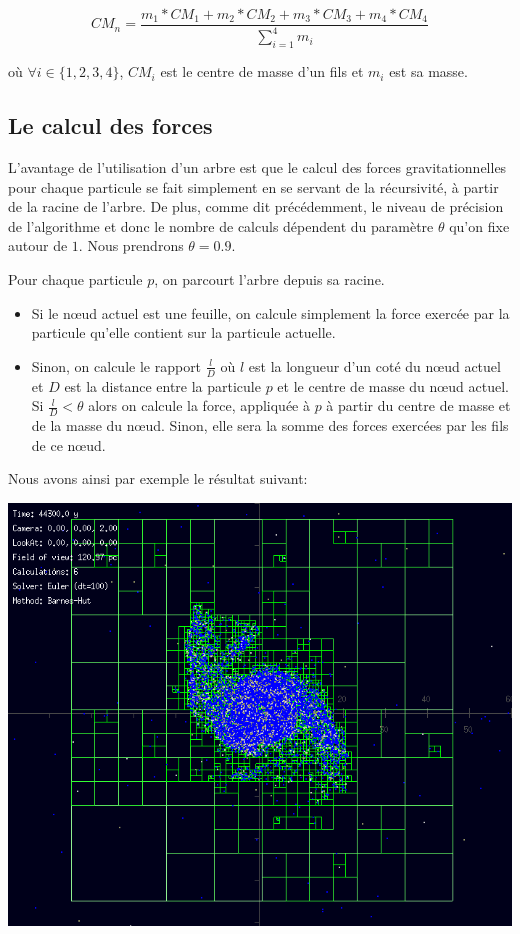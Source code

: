 \begin{equation}
    CM_n = \frac{m_1*CM_1 + m_2*CM_2+ m_3*CM_3 + m_4*CM_4 }{\sum_{i=1}^{4}{m_i}}
\end{equation}

où $\forall i\in \{1,2,3,4\}$, $CM_i$ est le centre de masse d'un fils et $m_i$ est sa masse.

\subsection{Le calcul des forces}

L'avantage de l'utilisation d'un arbre est que le calcul des forces gravitationnelles pour chaque particule se fait simplement en se servant de la récursivité, à partir de la racine de l'arbre. De plus, comme dit précédemment, le niveau de précision de l'algorithme et donc le nombre de calculs dépendent du paramètre $\theta$ qu'on fixe autour de $1$. Nous prendrons $\theta = 0.9$.

Pour chaque particule $p$, on parcourt l'arbre depuis sa racine.

\begin{itemize}
\item Si le nœud actuel est une feuille, on calcule simplement la force exercée par la particule qu'elle contient sur la particule actuelle.

\item Sinon, on calcule le rapport $\frac{l}{D}$ où $l$ est la
longueur d'un coté du nœud actuel  et $D$ est la distance entre la particule $p$ et le centre de masse du nœud actuel.
Si $\frac{l}{D} < \theta$ alors on calcule la force, appliquée à $p$ à partir du centre de masse et de la masse du nœud. Sinon, elle sera la somme des forces exercées par les fils de ce nœud.
\end{itemize}

\newpage
Nous avons ainsi par exemple le résultat suivant:
\begin{center}
\includegraphics[scale=0.8]{./images/BH_tree.png}
\captionsetup{hypcap=false}
\label{fig7}
\end{center}

